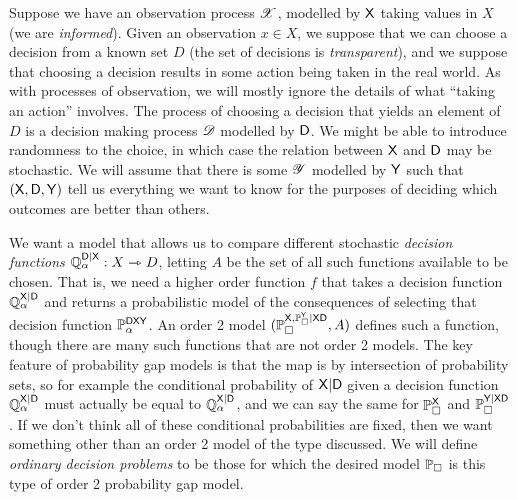 Suppose we have an observation process $\mathscr{X}$, modelled by $\mathsf{X}$ taking values in $X$ (we are \emph{informed}). Given an observation $x\in X$, we suppose that we can choose a decision from a known set $D$ (the set of decisions is \emph{transparent}), and we suppose that choosing a decision results in some action being taken in the real world. As with processes of observation, we will mostly ignore the details of what ``taking an action'' involves. The process of choosing a decision that yields an element of $D$ is a decision making process $\mathscr{D}$ modelled by $\mathsf{D}$. We might be able to introduce randomness to the choice, in which case the relation between $\mathsf{X}$ and $\mathsf{D}$ may be stochastic.  We will assume that there is some $\mathscr{Y}$ modelled by $\mathsf{Y}$ such that $(\mathsf{X},\mathsf{D},\mathsf{Y})$ tell us everything we want to know for the purposes of deciding which outcomes are better than others.

We want a model that allows us to compare different stochastic \emph{decision functions} $\mathbb{Q}^{\mathsf{D}|\mathsf{X}}_\alpha:X\rightarrowtriangle D$, letting $A$ be the set of all such functions available to be chosen. That is, we need a higher order function $f$ that takes a decision function $\mathbb{Q}^{\mathsf{X}|\mathsf{D}}_\alpha$ and returns a probabilistic model of the consequences of selecting that decision function $\mathbb{P}_\alpha^{\mathsf{DXY}}$. An order 2 model $(\mathbb{P}_\square^{\mathsf{X},\mathbb{P}_\square^{\mathsf{Y}}|\mathsf{XD}},A)$ defines such a function, though there are many such functions that are not order 2 models. The key feature of probability gap models is that the map is by intersection of probability sets, so for example the conditional probability of $\mathsf{X}|\mathsf{D}$ given a decision function $\mathbb{Q}^{\mathsf{X}|\mathsf{D}}_\alpha$ must actually be equal to $\mathbb{Q}^{\mathsf{X}|\mathsf{D}}_\alpha$, and we can say the same for $\mathbb{P}_\square^{\mathsf{X}}$ and $\mathbb{P}_\square^{\mathsf{Y}|\mathsf{XD}}$. If we don't think all of these conditional probabilities are fixed, then we want something other than an order 2 model of the type discussed. We will define \emph{ordinary decision problems} to be those for which the desired model $\mathbb{P}_\square$ is this type of order 2 probability gap model.



